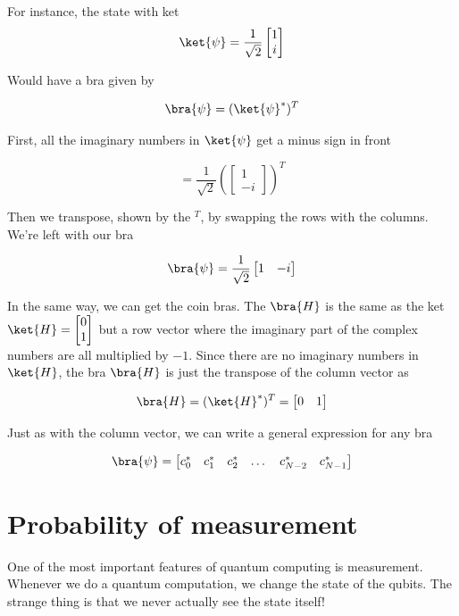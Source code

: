 \documentclass{book}
\begin{document}
For instance, the state with ket
$$\ket{\psi} = \frac{1}{\sqrt{2}} \begin{bmatrix} 1 \\ i \end{bmatrix} $$

Would have a bra given by 

$$
\bra{\psi} = (\ket{\psi}^*)^T 
$$

First, all the imaginary numbers in $\ket{\psi}$ get a minus sign in front 

 $$= \frac{1}{\sqrt{2}} \left(\begin{bmatrix} 1 \\ -i \end{bmatrix} \right)^T $$

Then we transpose, shown by the $^T$, by swapping the rows with the columns. We're left with our bra

$$\bra{\psi} = \frac{1}{\sqrt{2}} \begin{bmatrix} 1 & -i \end{bmatrix} $$


In the same way, we can get the coin bras. The $\bra{H}$ is the same as the ket $\ket{H} = \begin{bmatrix} 0 \\ 1 \end{bmatrix}$ but a row vector where the imaginary part of the complex numbers are all multiplied by $-1$. Since there are no imaginary numbers in $\ket{H}$, the bra $\bra{H}$ is just the transpose of the column vector as

$$
\bra{H} = (\ket{H}^*)^T = \begin{bmatrix} 0 & 1 \end{bmatrix}
$$

Just as with the column vector, we can write a general expression for any bra

$$
\bra{\psi} = \begin{bmatrix} c_0^* & c_1^* & c_2^* & \dots & c_{N-2}^* & c_{N-1}^* \end{bmatrix}
$$

\section{ Probability of measurement}


One of the most important features of quantum computing is measurement. Whenever we do a quantum computation, we change the state of the qubits. The strange thing is that we never actually see the state itself! 
\end{document}
